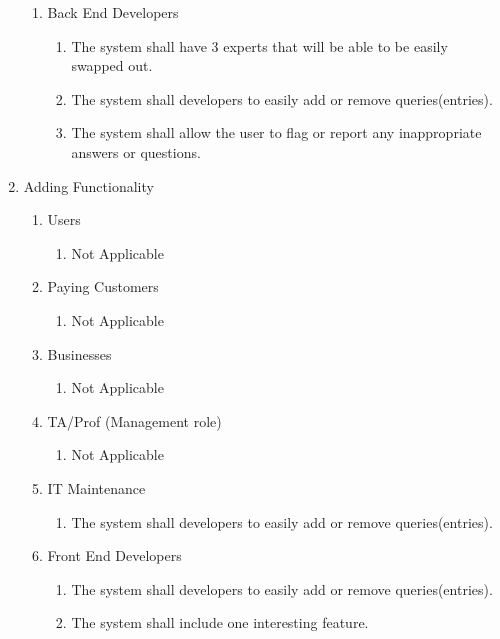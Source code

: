 \documentclass[titlepage]{article}
\begin{document}
\begin{enumerate}[\textbf{{BE}1.}]
\begin{enumerate}[\textbf{{VP3}.1}]
				\item Back End Developers
				\begin{enumerate}
					\item The system shall have 3 experts that will be able to be easily swapped out.
					\item The system shall developers to easily add or remove queries(entries).
					\item The system shall allow the user to flag or report any inappropriate answers or questions.
				\end{enumerate}
			\end{enumerate}
			
			\item Adding Functionality
			\begin{enumerate}[\textbf{{VP4}.1}]
				
				\item Users
				\begin{enumerate}
					\item Not Applicable
				\end{enumerate}
				
				\item Paying Customers
				\begin{enumerate}
					\item Not Applicable
				\end{enumerate}
				
				\item Businesses
				\begin{enumerate}
					\item Not Applicable
				\end{enumerate}
				
				\item TA/Prof (Management role)
				\begin{enumerate}
					\item Not Applicable
				\end{enumerate}
				
				\item IT Maintenance
				\begin{enumerate}
					\item The system shall developers to easily add or remove queries(entries).
				\end{enumerate}
				
				\item Front End Developers
				\begin{enumerate}
					\item The system shall developers to easily add or remove queries(entries).
					\item The system shall include one interesting feature.
				\end{enumerate}
				

\end{enumerate}
\end{enumerate}
\end{document}
